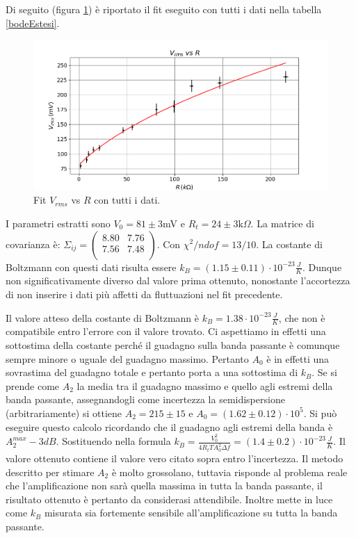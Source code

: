 \documentclass[10pt,a4paper]{article}
\begin{document}
Di seguito (figura \ref{boltzEstesi}) è riportato il fit eseguito con tutti i dati nella tabella \ref{bodeEstesi}.

\begin{figure}[!htb]
\centering
\includegraphics[scale=0.7]{boltzmannEstesoFit.png}
\caption{Fit $V_{rms}$ vs $R$ con tutti i dati.\label{boltzEstesi}}
\end{figure}

I parametri estratti sono $V_0 = 81 \pm 3$mV e $R_t = 24 \pm 3 \mbox{k}\Omega$. La matrice di covarianza è:  $\Sigma_{ij} = \left( \begin{array}{cc}
8.80 & 7.76\\ 
7.56 & 7.48\\
\end{array} \right)$. Con $\chi^2/ndof = 13/10$. La costante di Boltzmann con questi dati risulta essere $k_B = (1.15 \pm 0.11) \cdot 10^{-23} \frac{J}{K}$. Dunque non significativamente diverso dal valore prima ottenuto, nonostante l'accortezza di non inserire i dati più affetti da fluttuazioni nel fit precedente.


Il valore atteso della costante di Boltzmann è $k_{B} = 1.38 \cdot 10^{-23} \frac{J}{K}$, che non è compatibile entro l'errore con il valore trovato. Ci aspettiamo in effetti una sottostima della costante perché il guadagno sulla banda passante è comunque sempre minore o uguale del guadagno massimo. Pertanto $A_0$ è in effetti una sovrastima del guadagno totale e pertanto porta a una sottostima di $k_B$. 
Se si prende come $A_2$ la media tra il guadagno massimo e quello agli estremi della banda passante, assegnandogli come incertezza la semidispersione (arbitrariamente) si ottiene $A_2 = 215 \pm 15$ e $A_0 = (1.62 \pm 0.12) \cdot 10^{5}$. Si può eseguire questo calcolo ricordando che il guadagno agli estremi della banda è $A_2^{max} - 3 dB$. Sostituendo nella formula $k_B = \frac{V_0^2}{4 R_t T A_0^2 \Delta f}=(1.4 \pm 0.2) \cdot 10^{-23} \frac{J}{K}$. Il valore ottenuto contiene il valore vero citato sopra entro l'incertezza.
Il metodo descritto per stimare $A_2$ è molto grossolano, tuttavia risponde al problema reale che l'amplificazione non sarà quella massima in tutta la banda passante, il risultato ottenuto è pertanto da considerasi attendibile. Inoltre mette in luce come $k_B$ misurata sia fortemente sensibile all'amplificazione su tutta la banda passante. 
\end{document}
